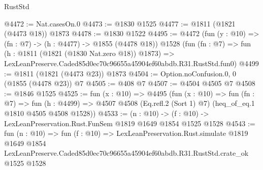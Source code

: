 \begin{lexlean}{RustStd}
\begin{coremodule}
@4472 := Nat.casesOn.{0}
@4473 := @1830 @1525
@4477 := @1811 (@1821 (@4473 @18)) @1873
@4478 := @1830 @1522
@4495 := @4472
    (fun (y : @10) => (fn : @7) -> (h : @4477) -> @1855 (@4478 @18))
    @1528
    (fun (fn : @7) =>
    fun (h : @1811 (@1821 (@1830 Nat.zero @18)) @1873) =>
    LexLeanPreserve.Caded85d0ec70c96655a45904ef60abdb.R31.RustStd.fun0)
@4499 := @1811 (@1821 (@4473 @23)) @1873
@4504 := Option.noConfusion.{0, 0} (@1855 (@4478 @23)) @7
@4505 := @408 @7
@4507 := @4504 @4505 @7
@4508 := @1846 @1525
@4525 := fun (x : @10) =>
  @4495
    (fun (x : @10) =>
    fun (fn : @7) =>
    fun (h : @4499) =>
    @4507 @4508 (Eq.refl.{2} (Sort 1) @7) (heq_of_eq.{1} @1810 @4505 @4508 @1528))
@4533 := (n : @10) -> (f : @10) -> LexLeanPreservation.Rust.FunSem @1819 @1649 @1854 @1525 @1528
@4543 := fun (n : @10) =>
  fun (f : @10) =>
  LexLeanPreservation.Rust.simulate
    @1819
    @1649
    @1854
    LexLeanPreserve.Caded85d0ec70c96655a45904ef60abdb.R31.RustStd.crate_ok
    @1525
    @1528
\end{coremodule}
\end{lexlean}
